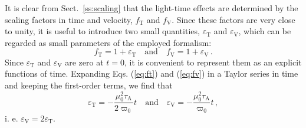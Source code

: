 \documentclass{aa}
\begin{document}
It is clear from Sect.~\ref{ss:scaling} that the light-time effects are
determined by the scaling factors in time and velocity, $f_\mathrm{T}$ and $f_\mathrm{V}$.
Since these factors are very
close to unity, it is useful to introduce two small quantities, $\varepsilon_\mathrm{T}$ and
$\varepsilon_\mathrm{V}$, which can be regarded as small parameters of the employed formalism:
\begin{equation}\label{eq:ftv-epsilon}
  f_\mathrm{T}=1+\varepsilon_\mathrm{T}\quad\mbox{and}\quad f_\mathrm{V}=1+\varepsilon_\mathrm{V}\,.
\end{equation}
Since $\varepsilon_\mathrm{T}$ and $\varepsilon_\mathrm{V}$ are zero at $t=0$, it is convenient to represent them as an explicit functions of time. Expanding Eqs. (\ref{eq:ft}) and (\ref{eq:fv}) in a Taylor series in time and keeping the first-order terms, we find that
\begin{equation}
  \varepsilon_\mathrm{T}=-\frac{\mu_0^2\tau_\mathrm{A}}{2\varpi_0}t
  \quad\mbox{and}\quad
  \varepsilon_\mathrm{V}=-\frac{\mu_0^2\tau_\mathrm{A}}{\varpi_0}t\,,
\end{equation}
i. e. $\varepsilon_\mathrm{V}=2\varepsilon_\mathrm{T}$.
\end{document}
